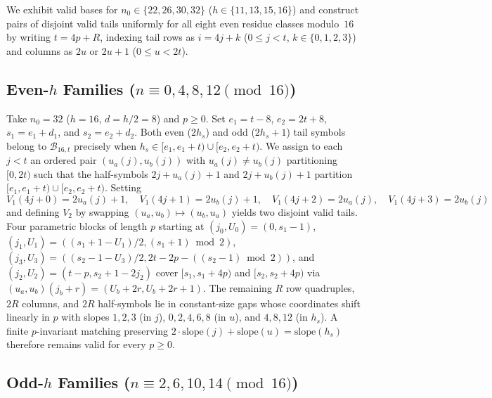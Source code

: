 \documentclass[11pt]{article}
\begin{document}
We exhibit valid bases for $n_0 \in \{22, 26, 30, 32\}$ ($h \in \{11, 13, 15, 16\}$) and construct pairs of disjoint valid tails uniformly for all eight even residue classes modulo~$16$ by writing $t = 4p + R$, indexing tail rows as $i = 4j + k$ ($0 \le j < t$, $k \in \{0,1,2,3\}$) and columns as $2u$ or $2u + 1$ ($0 \le u < 2t$).

\subsection{Even-$h$ Families ($n \equiv 0, 4, 8, 12 \pmod{16}$)}

Take $n_0 = 32$ ($h = 16$, $d = h/2 = 8$) and $p \ge 0$. Set $e_1 = t - 8$, $e_2 = 2t + 8$, $s_1 = e_1 + d_1$, and $s_2 = e_2 + d_2$. Both even ($2h_s$) and odd ($2h_s + 1$) tail symbols belong to $\mathcal{B}_{16, t}$ precisely when $h_s \in [e_1, e_1 + t) \cup [e_2, e_2 + t)$. We assign to each $j < t$ an ordered pair $(u_a(j), u_b(j))$ with $u_a(j) \ne u_b(j)$ partitioning $[0, 2t)$ such that the half-symbols $2j + u_a(j) + 1$ and $2j + u_b(j) + 1$ partition $[e_1, e_1 + t) \cup [e_2, e_2 + t)$. Setting
\[
  V_1(4j + 0) = 2u_a(j) + 1,\quad V_1(4j + 1) = 2u_b(j) + 1,\quad V_1(4j + 2) = 2u_a(j),\quad V_1(4j + 3) = 2u_b(j)
\]
and defining $V_2$ by swapping $(u_a, u_b) \mapsto (u_b, u_a)$ yields two disjoint valid tails. Four parametric blocks of length $p$ starting at $(j_0, U_0) = (0, s_1 - 1)$, $(j_1, U_1) = ((s_1 + 1 - U_1)/2, (s_1 + 1) \bmod 2)$, $(j_3, U_3) = ((s_2 - 1 - U_3)/2, 2t - 2p - ((s_2 - 1) \bmod 2))$, and $(j_2, U_2) = (t - p, s_2 + 1 - 2j_2)$ cover $[s_1, s_1 + 4p)$ and $[s_2, s_2 + 4p)$ via $(u_a, u_b)(j_b + r) = (U_b + 2r, U_b + 2r + 1)$. The remaining $R$ row quadruples, $2R$ columns, and $2R$ half-symbols lie in constant-size gaps whose coordinates shift linearly in $p$ with slopes $1,2,3$ (in $j$), $0,2,4,6,8$ (in $u$), and $4,8,12$ (in $h_s$). A finite $p$-invariant matching preserving $2\cdot\mathrm{slope}(j) + \mathrm{slope}(u) = \mathrm{slope}(h_s)$ therefore remains valid for every $p \ge 0$.

\subsection{Odd-$h$ Families ($n \equiv 2, 6, 10, 14 \pmod{16}$)}
\end{document}
